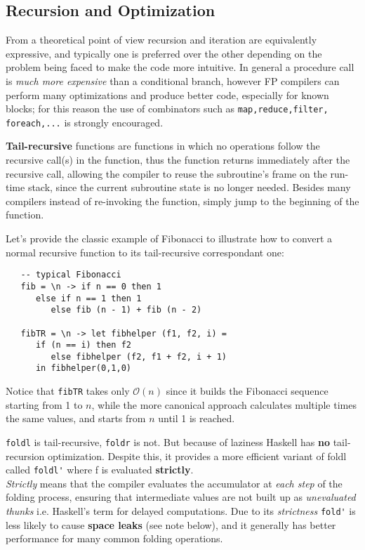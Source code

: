 \subsection{Recursion and Optimization}

From a theoretical point of view recursion and iteration are equivalently expressive,
and typically one is preferred over the other depending on the problem being faced to make the code more intuitive.
In general a procedure call is \textit{much more expensive} than a conditional branch,
however FP compilers can perform many optimizations and produce better code, especially for known blocks;
for this reason the use of combinators such as \lstinline|map,reduce,filter, foreach,...| is strongly encouraged.

\textbf{Tail-recursive} functions are functions in which no operations follow the recursive call(s) in the function,
thus the function returns immediately
after the recursive call,
allowing the compiler to reuse the subroutine's frame on the run-time
stack, since the current subroutine state is no longer needed.
Besides many compilers instead of re-invoking the function,
simply jump to the beginning of the function.

Let's provide the classic example of Fibonacci to illustrate how to convert a normal recursive function to its tail-recursive correspondant one:
\begin{lstlisting}
   -- typical Fibonacci
   fib = \n -> if n == 0 then 1
      else if n == 1 then 1
         else fib (n - 1) + fib (n - 2)
   
   fibTR = \n -> let fibhelper (f1, f2, i) =
      if (n == i) then f2
         else fibhelper (f2, f1 + f2, i + 1)
      in fibhelper(0,1,0)
\end{lstlisting}
Notice that \lstinline|fibTR| takes only $\mathcal{O}(n)$ since it builds the Fibonacci sequence starting from 1 to $n$,
while the more canonical approach calculates multiple times the same values,
and starts from $n$ until 1 is reached.

\lstinline|foldl| is tail-recursive, \lstinline|foldr| is not. But because of
laziness Haskell has \textbf{no} tail-recursion optimization.
Despite this, it provides a more efficient variant of foldl called \lstinline|foldl'| where f is evaluated \textbf{strictly}.\\
\textit{Strictly} means that the compiler evaluates the accumulator at \textit{each step} of the folding process, ensuring that intermediate values are not built up as \textit{unevaluated thunks} i.e. Haskell's term for delayed computations.
Due to its \textit{strictness} \lstinline|fold'| is less likely to cause \textbf{space leaks} (see note below), and it generally has better performance for many common folding operations.

